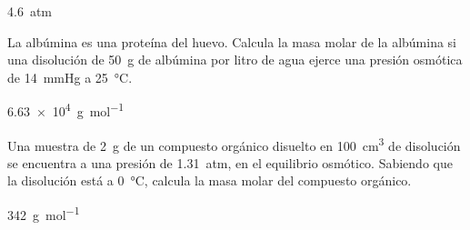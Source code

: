 \documentclass[10pt,a5paper,twoside]{article}
\begin{document}
  \begin{solution}
    \SI{4.6}{atm}
  \end{solution}




  \begin{exercise}[
      tags    = {termodinámica, entalpía, entalpia de reacción, calor},
      topics  = {química, termoquímica, termodinámica},
      source  = {FQ 1B SAN 2015, p94, e59},
    ]
    La albúmina es una proteína del huevo. Calcula la masa
    molar de la albúmina si una disolución de \SI{50}{\gram} de albúmina
    por litro de agua ejerce una presión osmótica de
    \SI{14}{\mmHg} a \SI{25}{\celsius}.
  \end{exercise}

  \begin{solution}
    \SI{6.63e4}{\gram\per\mole}
  \end{solution}




  \begin{exercise}[
      tags    = {termodinámica, entalpía, entalpia de reacción, calor},
      topics  = {química, termoquímica, termodinámica},
      source  = {FQ 1B OXF 2015, p79, e50},
    ]
    Una muestra de \SI{2}{\gram} de un compuesto orgánico disuelto en \SI{100}{\cubic\centi\meter} de disolución se encuentra a una presión de \SI{1.31}{atm}, en el equilibrio osmótico. Sabiendo que la disolución está a \SI{0}{\celsius}, calcula la masa molar del compuesto orgánico.
  \end{exercise}

  \begin{solution}
    \SI{342}{\gram\per\mole}
  \end{solution}
\end{document}
